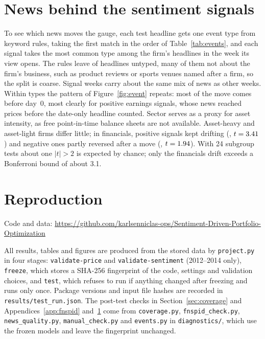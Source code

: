 \section{News behind the sentiment signals}\label{app:events}
To see which news moves the gauge, each test headline gets one event type from keyword rules, taking the first match in the order of Table~\ref{tab:events}, and each signal takes the most common type among the firm's headlines in the week its view opens. The rules leave \EvOtherShare{} of headlines untyped, many of them not about the firm's business, such as product reviews or sports venues named after a firm, so the split is coarse. Signal weeks carry about the same mix of news as other weeks. Within types the pattern of Figure~\ref{fig:event} repeats: most of the move comes before day~0, most clearly for positive earnings signals, whose news reached prices before the date-only headline counted. Sector serves as a proxy for asset intensity, as free point-in-time balance sheets are not available. Asset-heavy and asset-light firms differ little; in financials, positive signals kept drifting (\EvFinPosPost, $t=3.41$) and negative ones partly reversed after a \EvFinNegPre{} move (\EvFinNegPost, $t=1.94$). With 24 subgroup tests about one $|t|>2$ is expected by chance; only the financials drift exceeds a Bonferroni bound of about 3.1.
\begin{table}[H]\centering\footnotesize\setlength{\tabcolsep}{4pt}
\caption{Signals by the dominant event type of their week and by sector group, 2015--2025. Headlines: share of all test headlines and of headlines in signal weeks. Before: cumulative abnormal return (\%) from day $-10$ to day~0; after: from day~0 to day~20, with $t$ across signals. Asset-heavy: energy, materials, industrials, utilities and telecoms; asset-light: information technology, health care and consumer goods.}\label{tab:events}\end{table}

\section{Reproduction}\label{app:code}
\noindent Code and data: \url{https://github.com/karlsenniclas-ops/Sentiment-Driven-Portfolio-Optimization}

{\sloppy All results, tables and figures are produced from the stored data by \texttt{project.py} in four stages: \texttt{validate-price} and \texttt{validate-sentiment} (2012--2014 only), \texttt{freeze}, which stores a SHA-256 fingerprint of the code, settings and validation choices, and \texttt{test}, which refuses to run if anything changed after freezing and runs only once. Package versions and input file hashes are recorded in \texttt{results/test\_run.json}. The post-test checks in Section~\ref{sec:coverage} and Appendices~\ref{app:fnspid} and~\ref{app:events} come from \texttt{coverage.py}, \texttt{fnspid\_check.py}, \texttt{news\_quality.py}, \texttt{manual\_check.py} and \texttt{events.py} in \texttt{diagnostics/}, which use the frozen models and leave the fingerprint unchanged.\par}
